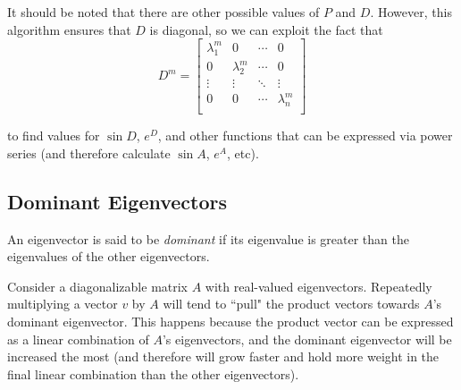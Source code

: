 \documentclass[12pt]{article}
\begin{document}
	It should be noted that there are other possible values of $P$ and $D$. However, this algorithm ensures that $D$ is diagonal, so we can exploit the fact that $$D^{m} =
	\begin{bmatrix}
	\lambda_{1}^{m} & 0               & \cdots & 0              \\
	0               & \lambda_{2}^{m} & \cdots & 0              \\
	\vdots          & \vdots          & \ddots & \vdots         \\
	0               & 0               & \cdots & \lambda_{n}^{m}\\
	\end{bmatrix}$$
	
	to find values for $\sin{D}$, $e^{D}$, and other functions that can be expressed via power series (and therefore calculate $\sin{A}$, $e^{A}$, etc).

	\subsection{Dominant Eigenvectors}

	
	An eigenvector is said to be \textit{dominant} if its eigenvalue is greater than the eigenvalues of the other eigenvectors.
	
	Consider a diagonalizable matrix $A$ with real-valued eigenvectors. Repeatedly multiplying a vector $v$ by $A$ will tend to ``pull" the product vectors towards $A$'s dominant eigenvector. This happens because the product vector can be expressed as a linear combination of $A$'s eigenvectors, and the dominant eigenvector will be increased the most (and therefore will grow faster and hold more weight in the final linear combination than the other eigenvectors).

\pagebreak

\printindex
\end{document}

